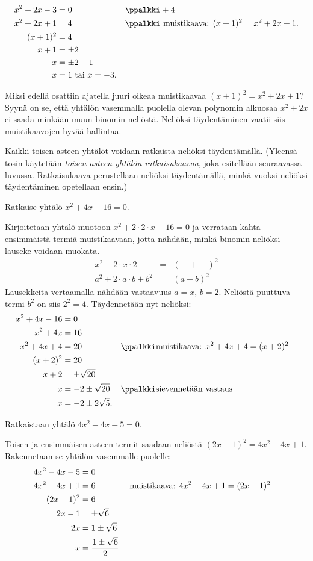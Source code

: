 \begin{align*}
x^2+2x-3 & = 0  &&\ppalkki +4 \\
x^2+2x+1 & = 4  &&\ppalkki \text{ muistikaava: } (x+1)^2=x^2+2x+1. \\
(x+1)^2 & = 4 \\
x+1 & = \pm 2 \\
x & = \pm 2 - 1 \\
x & = 1 \text{ tai } x= -3. 
\end{align*}

Miksi edellä osattiin ajatella juuri oikeaa muistikaavaa $(x+1)^2=x^2+2x+1$?
Syynä on se, että yhtälön vasemmalla
puolella olevan polynomin alkuosaa $x^2+2x$ ei saada minkään muun
binomin neliöstä. Neliöksi täydentäminen vaatii siis muistikaavojen hyvää
hallintaa.

Kaikki toisen asteen yhtälöt voidaan ratkaista neliöksi täydentämällä. (Yleensä tosin käytetään \emph{toisen asteen yhtälön ratkaisukaavaa}, joka esitellään seuraavassa luvussa. Ratkaisukaava perustellaan neliöksi täydentämällä, minkä vuoksi neliöksi täydentäminen opetellaan ensin.)

\begin{esimerkki} 
Ratkaise yhtälö $x^2+4x-16 = 0$. 

Kirjoitetaan yhtälö muotoon $x^2+2\cdot 2\cdot x-16 = 0$ ja verrataan kahta ensimmäistä termiä
muistikaavaan, jotta nähdään, minkä binomin neliöksi lauseke voidaan muokata.
\[ \begin{array}{lcl}
x^2+2\cdot x\cdot 2  &=& (\quad + \quad)^2\\
a^2 +2\cdot a\cdot b +b^2 &=& (a+b)^2
\end{array} \]
Lausekkeita vertaamalla nähdään vastaavuus $a = x$, $b = 2$. Neliöstä puuttuva
termi $b^2$ on siis $2^2=4$. Täydennetään nyt neliöksi:
\begin{align*}
x^2+4x-16 &= 0 \\
x^2+4x &= 16 && \\
x^2+4x+4 &= 20 && \ppalkki \text{muistikaava: $ x^2+4x+4= (x+2)^2$} \\
(x+2)^2 &= 20 \\
x+2 &= \pm \sqrt{20} \\
x &= -2 \pm \sqrt{20} && \ppalkki \text{sievennetään vastaus} \\
x &= -2 \pm 2\sqrt{5}.
\end{align*}
\end{esimerkki}

\begin{esimerkki}
Ratkaistaan yhtälö $4x^2-4x-5=0$.

Toisen ja ensimmäisen asteen termit saadaan neliöstä
$(2x-1)^2=4x^2-4x+1$. Rakennetaan se yhtälön vasemmalle puolelle:
\begin{align*}
4x^2-4x-5 &= 0 \\
4x^2-4x+1 &= 6 &&\text{muistikaava: $  4x^2-4x+1 = (2x-1)^2$} \\
(2x-1)^2 &= 6 \\
2x-1 &= \pm \sqrt{6} \\
2x &= 1 \pm \sqrt{6} \\
x &= \frac{1 \pm \sqrt{6}}{2}.
\end{align*}
\end{esimerkki}

